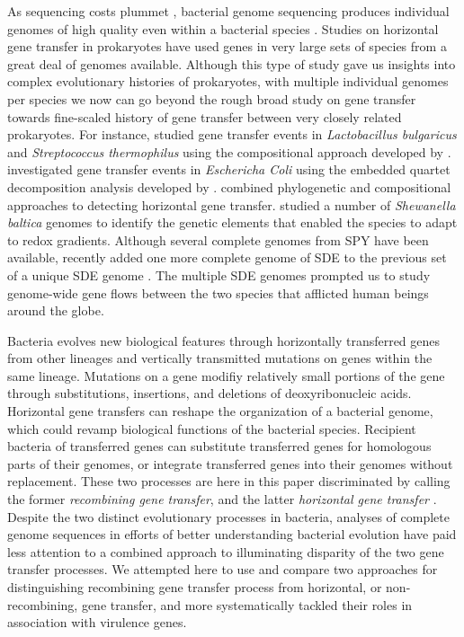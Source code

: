 \documentclass[english]{article}
\begin{document}
As sequencing costs plummet \citep{Mardis2011}, bacterial genome sequencing
produces individual genomes of high quality even within a bacterial species
\citep{Tettelin2009a}.  Studies on horizontal gene transfer in prokaryotes have
used genes in very large sets of species \citep{Koonin2001} from a great deal
of genomes available.  Although this type of study gave us insights into complex
evolutionary histories of prokaryotes, with multiple individual genomes per
species we now can go beyond the rough broad study on gene transfer towards
fine-scaled history of gene transfer between very closely related prokaryotes.
For instance, \citet{Liu2009} studied gene transfer events in
\textit{Lactobacillus bulgaricus} and \textit{Streptococcus thermophilus} using
the compositional approach developed by \citet{Karlin2001}. \citet{Luo2011}
investigated gene transfer events in \textit{Eschericha Coli} using the embedded
quartet decomposition analysis developed by \citet{Zhaxybayeva2006}.
\citet{Hamady2006} combined phylogenetic and compositional approaches to
detecting horizontal gene transfer.  \citet{Caro-Quintero2011} studied a number
of \textit{Shewanella baltica} genomes to identify the genetic elements that
enabled the species to adapt to redox gradients.  Although several complete
genomes from SPY have been available, \citet{Suzuki2011} recently added one more
complete genome of SDE to the previous set of a unique SDE genome
\citep{Shimomura2011}. The multiple SDE genomes prompted us to study
genome-wide gene flows between the two species that afflicted human beings
around the globe.

Bacteria evolves new biological features through horizontally transferred genes
from other lineages and vertically transmitted mutations on genes within the
same lineage.  Mutations on a gene modifiy relatively small portions of the gene
through substitutions, insertions, and deletions of deoxyribonucleic acids.
Horizontal gene transfers can reshape the organization of a bacterial genome,
which could revamp biological functions of the bacterial species.  Recipient
bacteria of transferred genes can substitute transferred genes for homologous
parts of their genomes, or integrate transferred genes into their genomes
without replacement. These two processes are here in this paper discriminated by
calling the former \textit{recombining gene transfer}, and the latter
\textit{horizontal gene transfer} \citep{Ochman2001,Lawrence2009}.  Despite the
two distinct evolutionary processes in bacteria, analyses of complete genome
sequences in efforts of better understanding bacterial evolution have paid less
attention to a combined approach to illuminating disparity of the two gene
transfer processes. We attempted here to use and compare two approaches for
distinguishing recombining gene transfer process from horizontal, or
non-recombining, gene transfer, and more systematically tackled their roles
in association with virulence genes.
\end{document}

